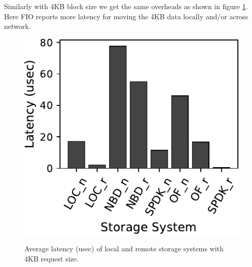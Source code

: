 {Similarly with 4KB block size we get the same overheads as shown in figure
\ref{fig:fio_4k}. Here FIO reports more latency for moving the 4KB data locally
and/or across network.

\begin{figure}[H]
  \includegraphics[width=\linewidth]{figures/fio_4k.pdf}\\
\caption{Average latency (usec) of local and remote storage systems with 4KB request size.}
\label{fig:fio_4k}
\end{figure}

}
